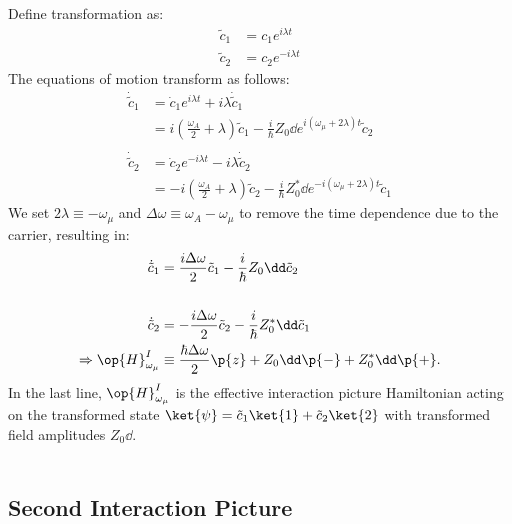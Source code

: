 Define transformation as:
\begin{align}
\tilde{c}_1 &= c_1e^{i\lambda t} \\
\tilde{c}_2 &= c_2e^{-i\lambda t}
\end{align}
The equations of motion transform as follows:
\begin{align}
\dot{\tilde{c}}_1 & = \dot{c}_1 e^{i \lambda t} + i \lambda \dot{\tilde{c}}_1 \\
& =  i(\frac{\omega_A}{2} + \lambda)\tilde{c}_1 - \frac{i}{\hbar}Z_0\dd e^{i(\omega_\mu +2\lambda)t}\tilde{c}_2\\
& \nonumber \\
\dot{\tilde{c}}_2 & = \dot{c}_2 e^{-i \lambda t} - i \lambda \dot{\tilde{c}}_2 \\
& =  -i(\frac{\omega_A}{2} + \lambda)\tilde{c}_2- \frac{i}{\hbar}Z_0^*\dd e^{-i(\omega_\mu +2\lambda)t}\tilde{c}_1
\end{align}
We set $2\lambda \equiv -\omega_\mu$ and $\Delta \omega \equiv \omega_A -\omega_\mu$ to remove the time dependence due to the carrier, resulting in:
\begin{align}
\dot{\tilde{c}}_1 & =  \frac{i\Delta\omega}{2}\tilde{c}_1 - \frac{i}{\hbar}Z_0\dd \tilde{c}_2\\
& \nonumber \\
\dot{\tilde{c}}_2 & =  -\frac{i\Delta \omega }{2}\tilde{c}_2- \frac{i}{\hbar}Z_0^*\dd \tilde{c}_1\\
 \Rightarrow \op{H}_{\omega_\mu}^{I} &\equiv \frac{\hbar \Delta\omega}{2}\p{z} + Z_0\dd\p{-} + Z_0^*\dd\p{+}.
\end{align}
In the last line, $\op{H}_{\omega_\mu}^{I}$ is the effective interaction picture Hamiltonian acting on the transformed state $\ket{\psi} = \tilde{c}_1\ket{1} + \tilde{c}_2\ket{2}$ with transformed field amplitudes $Z_0\dd$.
\\
\\
\subsection{Second Interaction Picture}

